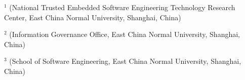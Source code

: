 \vspace{8pt}
\vspace{4pt}
\vspace{3pt}
\begingroup\fontsize{7.5pt}{10pt}\selectfont
\noindent$^{1}$ (National Trusted Embedded Software Engineering Technology Research Center, East China Normal University, Shanghai, China)\par
\noindent$^{2}$ (Information Governance Office, East China Normal University, Shanghai, China)\par
\noindent$^{3}$ (School of Software Engineering, East China Normal University, Shanghai, China)\par
\endgroup


